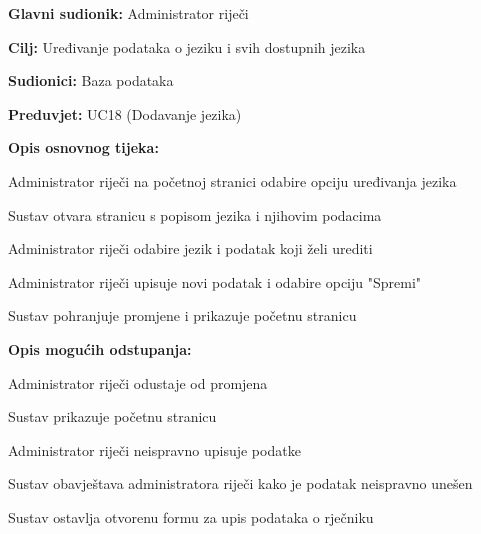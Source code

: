 				\noindent {}
				\begin{packed_item}
					
					\item \textbf{Glavni sudionik: }Administrator riječi
					\item  \textbf{Cilj:} Uređivanje podataka o jeziku i svih dostupnih jezika
					\item  \textbf{Sudionici:} Baza podataka
					\item  \textbf{Preduvjet:} UC18 (Dodavanje jezika)
					\item  \textbf{Opis osnovnog tijeka:}
					
					\item[] \begin{packed_enum}
						
						\item Administrator riječi na početnoj stranici odabire opciju uređivanja jezika
						\item Sustav otvara stranicu s popisom jezika i njihovim podacima
						\item Administrator riječi odabire jezik i podatak koji želi urediti
						\item Administrator riječi upisuje novi podatak i odabire opciju "Spremi"
						\item Sustav pohranjuje promjene i prikazuje početnu stranicu 
						
					\end{packed_enum}
					
					\item  \textbf{Opis mogućih odstupanja:}
					
					\item[] \begin{packed_item}
						
						
						\item[5.a] Administrator riječi odustaje od promjena
						\item[] \begin{packed_enum}
							
							\item Sustav prikazuje početnu stranicu
							
						\end{packed_enum}
						
						\item[5.b] Administrator riječi neispravno upisuje podatke
						\item[] \begin{packed_enum}
							
							\item Sustav obavještava administratora riječi kako je podatak neispravno unešen
							\item Sustav ostavlja otvorenu formu za upis podataka o rječniku
							
						\end{packed_enum}
					\end{packed_item}
				\end{packed_item}
				
